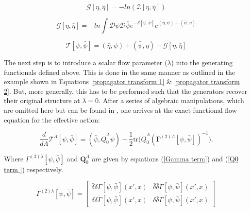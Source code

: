 \documentclass[11pt]{article}
\begin{document}
\begin{equation} \label{Greens function functional}
    \mathcal{G}[\eta, \bar{\eta}] = -ln(\mathcal{Z}[\eta, \bar{\eta}])
\end{equation}

\begin{equation}\label{G term in effective action}
    \mathcal{G}[\eta, \bar{\eta}] = 
    -ln \int{\mathcal{D}\psi \mathcal{D} \bar{\psi}e^{-\mathcal{S}[\psi, \bar{\psi}]}e^{(\bar{\eta}, \psi) +(\bar{\psi}, \eta)}}
\end{equation}

\begin{equation} \label{Effective action}
    \mathcal{T}[\psi, \bar{\psi}] = (\bar{\eta},\psi) + (\bar{\psi},\eta) + \mathcal{G}[\eta, \bar{\eta}]
\end{equation}


\noindent The next step is to introduce a scalar flow parameter ($\lambda$) into the generating functionals defined above. This is done in the same manner as outlined in the example shown in Equations \ref{propagator transform 1} $\&$ \ref{propagator transform 2}. 
But, more generally, this has to be performed such that the generators recover their original structure at $\lambda = 0 $.
After a series of algebraic manipulations, which are omitted here but can be found in \cite{metzner2012functional}, one arrives at the exact functional flow equation for the effective action:


\begin{equation} \label{eq:ExactFunctionalFlowEquation}
    \frac{d}{d\Lambda} \mathcal{T}^{\Lambda}[\psi, \bar{\psi}] = (\bar{\psi}, \dot{Q}_0^{\Lambda} \psi) - \frac{1}{2} \text{tr} \big( \dot{Q}_0^{\Lambda} (\boldsymbol{\Gamma}^{(2)\Lambda}[\psi, \bar{\psi}])^{-1} \big).
\end{equation}

\noindent Where $\Gamma^{(2)\lambda}[\psi, \bar{\psi}]$ and  $\textbf{Q}_0^{\Lambda}$ are given by equations (\ref{Gamma term}) and (\ref{Q0 term }) respectively.



\begin{equation}\label{Gamma term}
\Gamma^{(2)\lambda}[\psi, \bar{\psi}] = 
\begin{bmatrix}
\bar{\delta} \delta \Gamma[\psi, \bar{\psi}](x',x) & \bar{\delta} \bar{\delta} \Gamma[\psi, \bar{\psi}](x',x) \\
\delta \delta \Gamma[\psi, \bar{\psi}](x',x)  & \delta \bar{\delta} \Gamma[\psi, \bar{\psi}](x',x)
\end{bmatrix}
\end{equation}
\end{document}
